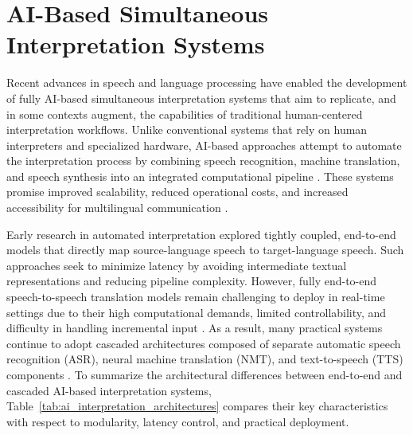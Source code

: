 \section{AI-Based Simultaneous Interpretation Systems}

Recent advances in speech and language processing have enabled the development of fully AI-based simultaneous interpretation systems that aim to replicate, and in some contexts augment, the capabilities of traditional human-centered interpretation workflows. Unlike conventional systems that rely on human interpreters and specialized hardware, AI-based approaches attempt to automate the interpretation process by combining speech recognition, machine translation, and speech synthesis into an integrated computational pipeline \cite{popescu-belis2025s2streview}. These systems promise improved scalability, reduced operational costs, and increased accessibility for multilingual communication \cite{ozkaya2023transformative}.

Early research in automated interpretation explored tightly coupled, end-to-end models that directly map source-language speech to target-language speech. Such approaches seek to minimize latency by avoiding intermediate textual representations and reducing pipeline complexity. However, fully end-to-end speech-to-speech translation models remain challenging to deploy in real-time settings due to their high computational demands, limited controllability, and difficulty in handling incremental input \cite{jia2022translatotron2}. As a result, many practical systems continue to adopt cascaded architectures composed of separate automatic speech recognition (ASR), neural machine translation (NMT), and text-to-speech (TTS) components \cite{popescu-belis2025s2streview, Sethiya2023EndtoEndSurvey}. To summarize the architectural differences between end-to-end and cascaded AI-based interpretation systems, Table~\ref{tab:ai_interpretation_architectures} compares their key characteristics with respect to modularity, latency control, and practical deployment.

